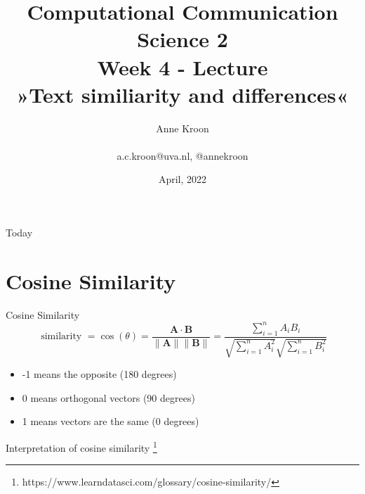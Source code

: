 \documentclass[handout]{beamer}
\title[Computational Communication Science 2]{\textbf{Computational Communication Science 2} \\Week 4 - Lecture\\ »Text similiarity and differences«}
\author[Anne Kroon]{Anne Kroon \\ ~ \\ \footnotesize{a.c.kroon@uva.nl, @annekroon} \\}
\date{April, 2022}
\institute[Digital Society Minor, University of Amsterdam]{Digital Society Minor, University of Amsterdam}
\begin{document}
	
	\begin{frame}{}
		\titlepage
	\end{frame}
	
\begin{frame}{Today}
	\tableofcontents
\end{frame}

\section{Cosine Similarity}

\begin{frame}{Cosine Similarity} 
$$
\text { similarity }=\cos (\theta)=\frac{\mathbf{A} \cdot \mathbf{B}}{\|\mathbf{A}\|\|\mathbf{B}\|}=\frac{\sum_{i=1}^{n} A_{i} B_{i}}{\sqrt{\sum_{i=1}^{n} A_{i}^{2}} \sqrt{\sum_{i=1}^{n} B_{i}^{2}}}
$$

\pause

\begin{itemize}
\item -1 means the opposite (180 degrees) 
\item 0 means orthogonal vectors (90 degrees)
\item 1 means vectors are the same (0 degrees)
\end{itemize}
\end{frame}


\begin{frame}
Interpretation of cosine similarity  \footnote{https://www.learndatasci.com/glossary/cosine-similarity/}
\end{frame}
\end{document}
